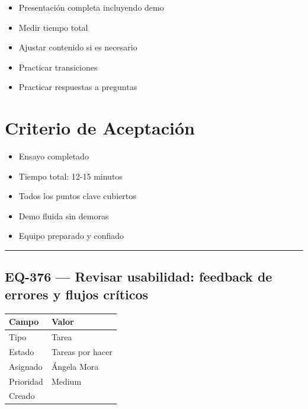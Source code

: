 \documentclass[
  spanish,
  11pt,
]{report}
\newcounter{none} %
\providecommand{\tightlist}{%
  \setlength{\itemsep}{0pt}\setlength{\parskip}{0pt}}
\begin{document}
\begin{itemize}
\tightlist
\item
  Presentación completa incluyendo demo
\item
  Medir tiempo total
\item
  Ajustar contenido si es necesario
\item
  Practicar transiciones
\item
  Practicar respuestas a preguntas
\end{itemize}

\section{Criterio de Aceptación}\label{criterio-de-aceptaciuxf3n-12}

\begin{itemize}
\tightlist
\item[$\square$]
  Ensayo completado
\item[$\square$]
  Tiempo total: 12-15 minutos
\item[$\square$]
  Todos los puntos clave cubiertos
\item[$\square$]
  Demo fluida sin demoras
\item[$\square$]
  Equipo preparado y confiado
\end{itemize}

\begin{center}\rule{0.5\linewidth}{0.5pt}\end{center}

\subsection{EQ-376 --- Revisar usabilidad: feedback de errores y flujos
críticos}\label{eq-376-revisar-usabilidad-feedback-de-errores-y-flujos-cruxedticos}

{\def\LTcaptype{none} %
\begin{longtable}[]{@{}ll@{}}
\toprule\noalign{}
Campo & Valor \\
\midrule\noalign{}
\endhead
\bottomrule\noalign{}
\endlastfoot
Tipo & Tarea \\
Estado & Tareas por hacer \\
Asignado & Ángela Mora \\
Prioridad & Medium \\
Creado & \\
\end{longtable}
}
\end{document}
